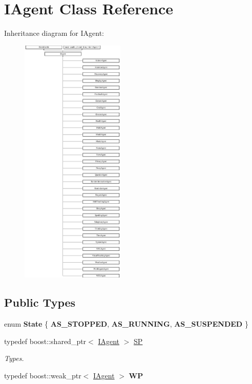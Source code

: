 \hypertarget{class_i_agent}{}\section{I\+Agent Class Reference}
\label{class_i_agent}
Inheritance diagram for I\+Agent\+:\begin{figure}[H]
\begin{center}
\leavevmode
\includegraphics[height=12.000000cm]{class_i_agent}
\end{center}
\end{figure}
\subsection*{Public Types}
\begin{DoxyCompactItemize}
\item 
\mbox{\label{class_i_agent_ac78c4d9c6aeb907135b88b0ee4a269c0}} 
enum {\bfseries State} \{ {\bfseries A\+S\+\_\+\+S\+T\+O\+P\+P\+ED}, 
{\bfseries A\+S\+\_\+\+R\+U\+N\+N\+I\+NG}, 
{\bfseries A\+S\+\_\+\+S\+U\+S\+P\+E\+N\+D\+ED}
 \}
\item 
\mbox{\label{class_i_agent_a9e88f0528d282c33200a2d43d1c29a73}} 
typedef boost\+::shared\+\_\+ptr$<$ \hyperlink{class_i_agent}{I\+Agent} $>$ \hyperlink{class_i_agent_a9e88f0528d282c33200a2d43d1c29a73}{SP}
\begin{DoxyCompactList}\small\item\em Types. \end{DoxyCompactList}\item 
\mbox{\label{class_i_agent_ad41d667d4605b781f81485e4f2cb6d40}} 
typedef boost\+::weak\+\_\+ptr$<$ \hyperlink{class_i_agent}{I\+Agent} $>$ {\bfseries WP}
\end{DoxyCompactItemize}
